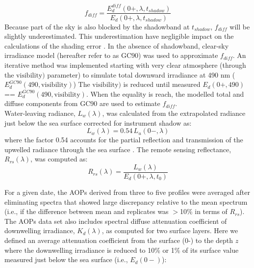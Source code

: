 \documentclass[essd, manuscript]{copernicus}
\begin{document}
\begin{equation}
 \label{eq:diffuseEd}
f_{diff} = \frac{E_d^{diff}(0+,\lambda,t_{shadow})}{E_d(0+,\lambda,t_{shadow})}
\end{equation}
Because part of the sky is also blocked by the shadowband at $t_{shadow}$, $f_{diff}$ will be slightly underestimated. This underestimation have negligible impact on the calculations of the shading error \citep{Belanger2017}. In the absence of shadowband, \citet{Gregg1990} clear-sky irradiance model (hereafter refer to as GC90) was used to approximate $f_{diff}$. An iterative method was implemented starting with very clear atmosphere (through the $\mathrm{visibility})$ parameter) to simulate total downward irradiance at 490 nm ($E_d^{GC90}(490, \mathrm{visibility})$)  The $\mathrm{visibility})$ is reduced until measured $E_d(0+,490)$ == $E_d^{GC90}(490, \mathrm{visibility})$. When the equality is reach, the modelled total and diffuse components from GC90 are used to estimate $f_{diff}$. \\ 

Water-leaving radiance, $L_w(\lambda)$, was calculated from the extrapolated radiance just below the sea surface corrected for instrument shadow as:
 \begin{equation}
 \label{eq:L_w}
L_w(\lambda) = 0.54\,L_u(0-,\lambda)
\end{equation}
where the factor 0.54 accounts for the partial reflection and transmission of the upwelled radiance through the sea surface \citep{Mueller2003}. 
The remote sensing reflectance, $R_{rs}(\lambda)$, was computed as:
 \begin{equation}
 \label{eq:Rrs}
R_{rs}(\lambda) = \frac{L_w(\lambda)}{E_d(0+,\lambda,t_0)} 
\end{equation}

For a given date, the AOPs derived from three to five profiles were averaged after eliminating spectra that showed large discrepancy relative to the mean spectrum (i.e., if the difference between mean and replicates was $>$10\% in terms of $R_{rs}$).\\  

The AOPs data set also includes spectral diffuse attenuation coefficient of downwelling irradiance, $K_d(\lambda)$, as computed for two surface layers. Here we defined an average attenuation coefficient from the surface (0-) to the depth $z$ where the downwelling irradiance is reduced to 10\% or 1\% of its surface value measured just below the sea surface (i.e., $E_d(0-)$):  
\end{document}
